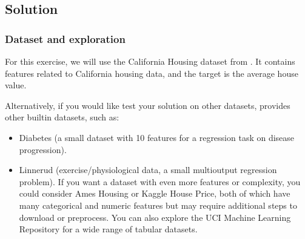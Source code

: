 \documentclass[letterpaper,10pt,english]{jupyterBook}
\begin{document}
\subsection{Solution}
\label{\detokenize{03:solution}}

\subsubsection{Dataset and exploration}
\label{\detokenize{03:dataset-and-exploration}}
\sphinxAtStartPar
For this exercise, we will use the California Housing dataset from . It contains features related to California housing data, and the target is the average house value.

\sphinxAtStartPar
Alternatively, if you would like test your solution on other datasets,  provides other built\sphinxhyphen{}in datasets, such as:
\begin{itemize}
\item {} 
\sphinxAtStartPar
Diabetes (a small dataset with 10 features for a regression task on disease progression).

\item {} 
\sphinxAtStartPar
Linnerud (exercise/physiological data, a small multi\sphinxhyphen{}output regression problem).
If you want a dataset with even more features or complexity, you could consider Ames Housing or Kaggle House Price, both of which have many categorical and numeric features but may require additional steps to download or preprocess. You can also explore the UCI Machine Learning Repository for a wide range of tabular datasets.

\end{itemize}
\end{document}
